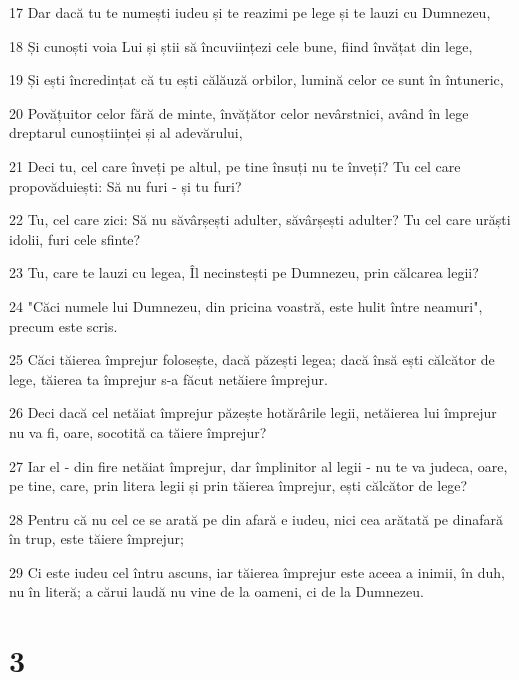 \par 17 Dar dacă tu te numești iudeu și te reazimi pe lege și te lauzi cu Dumnezeu,
\par 18 Și cunoști voia Lui și știi să încuviințezi cele bune, fiind învățat din lege,
\par 19 Și ești încredințat că tu ești călăuză orbilor, lumină celor ce sunt în întuneric,
\par 20 Povățuitor celor fără de minte, învățător celor nevârstnici, având în lege dreptarul cunoștiinței și al adevărului,
\par 21 Deci tu, cel care înveți pe altul, pe tine însuți nu te înveți? Tu cel care propovăduiești: Să nu furi - și tu furi?
\par 22 Tu, cel care zici: Să nu săvârșești adulter, săvârșești adulter? Tu cel care urăști idolii, furi cele sfinte?
\par 23 Tu, care te lauzi cu legea, Îl necinstești pe Dumnezeu, prin călcarea legii?
\par 24 "Căci numele lui Dumnezeu, din pricina voastră, este hulit între neamuri", precum este scris.
\par 25 Căci tăierea împrejur folosește, dacă păzești legea; dacă însă ești călcător de lege, tăierea ta împrejur s-a făcut netăiere împrejur.
\par 26 Deci dacă cel netăiat împrejur păzește hotărârile legii, netăierea lui împrejur nu va fi, oare, socotită ca tăiere împrejur?
\par 27 Iar el - din fire netăiat împrejur, dar împlinitor al legii - nu te va judeca, oare, pe tine, care, prin litera legii și prin tăierea împrejur, ești călcător de lege?
\par 28 Pentru că nu cel ce se arată pe din afară e iudeu, nici cea arătată pe dinafară în trup, este tăiere împrejur;
\par 29 Ci este iudeu cel întru ascuns, iar tăierea împrejur este aceea a inimii, în duh, nu în literă; a cărui laudă nu vine de la oameni, ci de la Dumnezeu.

\chapter{3}

